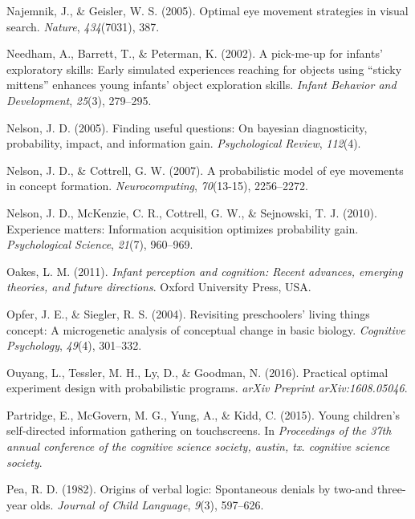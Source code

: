 \documentclass[oneside]{report}
\begin{document}
\hypertarget{ref-najemnik2005optimal}{}
Najemnik, J., \& Geisler, W. S. (2005). Optimal eye movement strategies
in visual search. \emph{Nature}, \emph{434}(7031), 387.

\hypertarget{ref-needham2002pick}{}
Needham, A., Barrett, T., \& Peterman, K. (2002). A pick-me-up for
infants' exploratory skills: Early simulated experiences reaching for
objects using ``sticky mittens'' enhances young infants' object
exploration skills. \emph{Infant Behavior and Development},
\emph{25}(3), 279--295.

\hypertarget{ref-nelson2005finding}{}
Nelson, J. D. (2005). Finding useful questions: On bayesian
diagnosticity, probability, impact, and information gain.
\emph{Psychological Review}, \emph{112}(4).

\hypertarget{ref-nelson2007probabilistic}{}
Nelson, J. D., \& Cottrell, G. W. (2007). A probabilistic model of eye
movements in concept formation. \emph{Neurocomputing}, \emph{70}(13-15),
2256--2272.

\hypertarget{ref-nelson2010experience}{}
Nelson, J. D., McKenzie, C. R., Cottrell, G. W., \& Sejnowski, T. J.
(2010). Experience matters: Information acquisition optimizes
probability gain. \emph{Psychological Science}, \emph{21}(7), 960--969.

\hypertarget{ref-oakes2011infant}{}
Oakes, L. M. (2011). \emph{Infant perception and cognition: Recent
advances, emerging theories, and future directions}. Oxford University
Press, USA.

\hypertarget{ref-opfer2004revisiting}{}
Opfer, J. E., \& Siegler, R. S. (2004). Revisiting preschoolers' living
things concept: A microgenetic analysis of conceptual change in basic
biology. \emph{Cognitive Psychology}, \emph{49}(4), 301--332.

\hypertarget{ref-ouyang2016practical}{}
Ouyang, L., Tessler, M. H., Ly, D., \& Goodman, N. (2016). Practical
optimal experiment design with probabilistic programs. \emph{arXiv
Preprint arXiv:1608.05046}.

\hypertarget{ref-partridge2015young}{}
Partridge, E., McGovern, M. G., Yung, A., \& Kidd, C. (2015). Young
children's self-directed information gathering on touchscreens. In
\emph{Proceedings of the 37th annual conference of the cognitive science
society, austin, tx. cognitive science society}.

\hypertarget{ref-pea1982origins}{}
Pea, R. D. (1982). Origins of verbal logic: Spontaneous denials by
two-and three-year olds. \emph{Journal of Child Language}, \emph{9}(3),
597--626.
\end{document}
